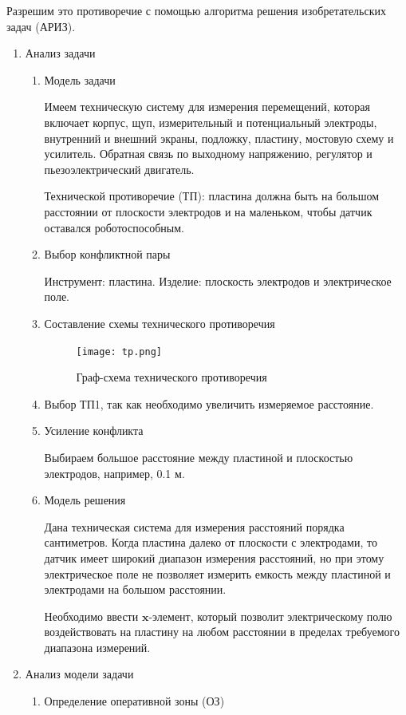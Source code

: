Разрешим это противоречие с помощью алгоритма решения изобретательских задач (АРИЗ).


\begin{enumerate}[1]
	\item Анализ задачи
	\begin{enumerate}
	\item Модель задачи
		
		Имеем техническую систему для измерения перемещений, которая включает корпус, щуп, измерительный и потенциальный электроды, внутренний и внешний экраны, подложку, пластину, мостовую схему и усилитель. Обратная связь по выходному напряжению, регулятор и пьезоэлектрический двигатель.
		
		Технической противоречие (ТП): пластина должна быть на большом расстоянии от плоскости электродов и на маленьком, чтобы датчик оставался роботоспособным.
		
		\item Выбор конфликтной пары
		
		Инструмент: пластина. Изделие: плоскость электродов и электрическое поле.
		
		\item Составление схемы технического противоречия 
		
		\begin{figure}[h!]
			\centering
			\texttt{[image: tp.png]}
			\caption{Граф-схема технического противоречия}
			\label{tp}
		\end{figure}
		
		\item Выбор ТП1, так как необходимо увеличить измеряемое расстояние.
		\item Усиление конфликта
		
		Выбираем большое расстояние между пластиной и плоскостью электродов, например, 0.1 м.
		\item Модель решения
		
		Дана техническая система для измерения расстояний порядка сантиметров. Когда пластина далеко от плоскости с электродами, то датчик имеет широкий диапазон измерения расстояний, но при этому электрическое поле не позволяет измерить емкость между пластиной и электродами на большом расстоянии.
		
		Необходимо ввести $\textbf{x}$-элемент, который позволит электрическому полю воздействовать на пластину на любом расстоянии в пределах требуемого диапазона измерений.	
	\end{enumerate}
	\item Анализ модели задачи
	\begin{enumerate}
		\item Определение оперативной зоны (ОЗ)	
		

\end{enumerate}
\end{enumerate}
